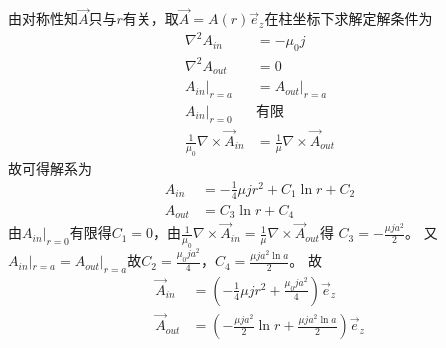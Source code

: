 \documentclass{phyasgn}
\begin{document}
\begin{sol}[4]
    由对称性知$\vec{A}$只与$r$有关，取$\vec{A}=A(r)\vec{e}_z$在柱坐标下求解定解条件为
    \begin{align*}
        \nabla^2 A_{in}&=-\mu_0 j\\
        \nabla^2 A_{out}&=0\\
        A_{in}|_{r=a}&=A_{out}|_{r=a}\\
        A_{in}|_{r=0}&\text{有限}\\
        \frac{1}{\mu_0}\nabla\times\vec{A}_{in}&=\frac{1}{\mu}\nabla\times\vec{A}_{out}
    \end{align*}
    故可得解系为
    \begin{align*}
        A_{in}&=-\frac{1}{4}\mu jr^2+C_1\ln r+C_2\\
        A_{out}&=C_3\ln r+C_4
    \end{align*}
    由$A_{in}|_{r=0}\text{有限}$得$C_1=0$，由$\frac{1}{\mu_0}\nabla\times\vec{A}_{in}=\frac{1}{\mu}\nabla\times\vec{A}_{out}$得
    $C_3=-\frac{\mu ja^2}{2}$。
    又$A_{in}|_{r=a}=A_{out}|_{r=a}$故$C_2=\frac{\mu_0ja^2}{4}$，$C_4=\frac{\mu ja^2\ln a}{2}$。
    故
    \begin{align*}
        \vec{A}_{in}&=\left(-\frac{1}{4}\mu jr^2+\frac{\mu_0ja^2}{4}\right)\vec{e}_z\\
        \vec{A}_{out}&=\left(-\frac{\mu ja^2}{2}\ln r+\frac{\mu ja^2\ln a}{2}\right)\vec{e}_z
    \end{align*}
\end{sol}
\end{document}
